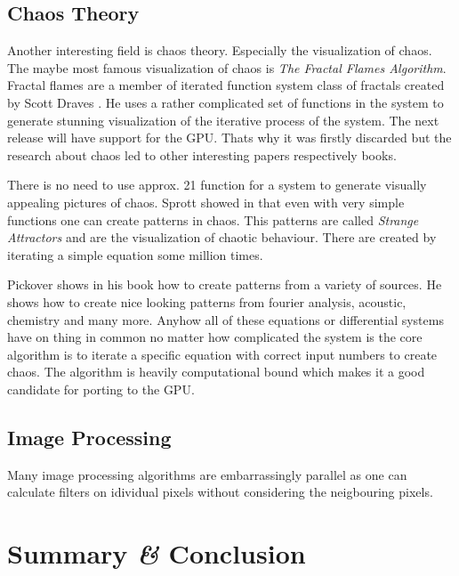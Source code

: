 \subsection{Chaos Theory} %
\label{par:chaos_theory}
Another interesting field is chaos theory. Especially the visualization of
chaos. The maybe most famous visualization of chaos is \emph{The Fractal Flames
Algorithm}. Fractal flames are a member of iterated function system class of
fractals created by Scott Draves \citep{citeulike:3801950}. He uses a rather
complicated set of functions in the system to generate stunning visualization of
the iterative process of the system. The next release will have support for the
GPU. Thats why it was firstly discarded but the research about chaos led to
other interesting papers respectively books.

There is no need to use approx. 21 function for a system to generate visually
appealing pictures of chaos. Sprott showed in \citep{citeulike:3745535} that even
with very simple functions one can create patterns in chaos. This patterns are
called \emph{Strange Attractors} and are the visualization of chaotic behaviour.
There are created by iterating a simple equation some million times. 

Pickover shows in his book \citep{citeulike:3812233} how to create patterns from
a variety of sources. He shows how to create nice looking patterns from fourier
analysis, acoustic, chemistry and many more. Anyhow all of these equations or
differential systems have on thing in common no matter how complicated the
system is the core algorithm is to iterate a specific equation with correct
input numbers to create chaos. The algorithm is heavily computational bound
which makes it a good candidate for porting to the GPU.


\subsection{Image Processing}
Many image processing algorithms are embarrassingly parallel as one can calculate
filters on idividual pixels without considering the neigbouring pixels. 



\section{Summary \textit{\&} Conclusion} %
\label{sec:summary_conclusion}





